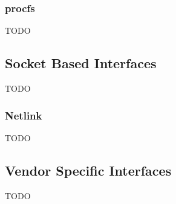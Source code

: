 \subsubsection*{procfs}

TODO

\subsection{Socket Based Interfaces}

TODO

\subsubsection*{Netlink}

TODO

\subsection{Vendor Specific Interfaces}

TODO
